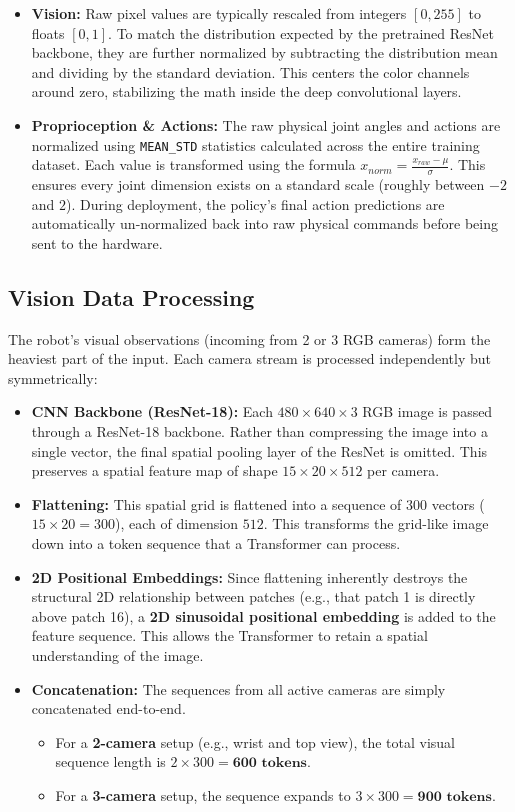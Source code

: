 \documentclass[11pt,a4paper]{article}
\begin{document}
\begin{itemize}
    \item \textbf{Vision:} Raw pixel values are typically rescaled from integers $[0, 255]$ to floats $[0, 1]$. To match the distribution expected by the pretrained ResNet backbone, they are further normalized by subtracting the distribution mean and dividing by the standard deviation. This centers the color channels around zero, stabilizing the math inside the deep convolutional layers.
    \item \textbf{Proprioception \& Actions:} The raw physical joint angles and actions are normalized using \texttt{MEAN\_STD} statistics calculated across the entire training dataset. Each value is transformed using the formula $x_{norm} = \frac{x_{raw} - \mu}{\sigma}$. This ensures every joint dimension exists on a standard scale (roughly between $-2$ and $2$). During deployment, the policy's final action predictions are automatically un-normalized back into raw physical commands before being sent to the hardware.
\end{itemize}

\subsection{Vision Data Processing}
The robot's visual observations (incoming from 2 or 3 RGB cameras) form the heaviest part of the input. Each camera stream is processed independently but symmetrically:

\begin{itemize}
    \item \textbf{CNN Backbone (ResNet-18):} Each $480 \times 640 \times 3$ RGB image is passed through a ResNet-18 backbone. Rather than compressing the image into a single vector, the final spatial pooling layer of the ResNet is omitted. This preserves a spatial feature map of shape $15 \times 20 \times 512$ per camera.
    \item \textbf{Flattening:} This spatial grid is flattened into a sequence of $300$ vectors ($15 \times 20 = 300$), each of dimension $512$. This transforms the grid-like image down into a token sequence that a Transformer can process.
    \item \textbf{2D Positional Embeddings:} Since flattening inherently destroys the structural 2D relationship between patches (e.g., that patch 1 is directly above patch 16), a \textbf{2D sinusoidal positional embedding} is added to the feature sequence. This allows the Transformer to retain a spatial understanding of the image.
    \item \textbf{Concatenation:} The sequences from all active cameras are simply concatenated end-to-end. 
    \begin{itemize}
        \item For a \textbf{2-camera} setup (e.g., wrist and top view), the total visual sequence length is $2 \times 300 = \textbf{600 tokens}$.
        \item For a \textbf{3-camera} setup, the sequence expands to $3 \times 300 = \textbf{900 tokens}$.
    \end{itemize}
\end{itemize}
\end{document}
